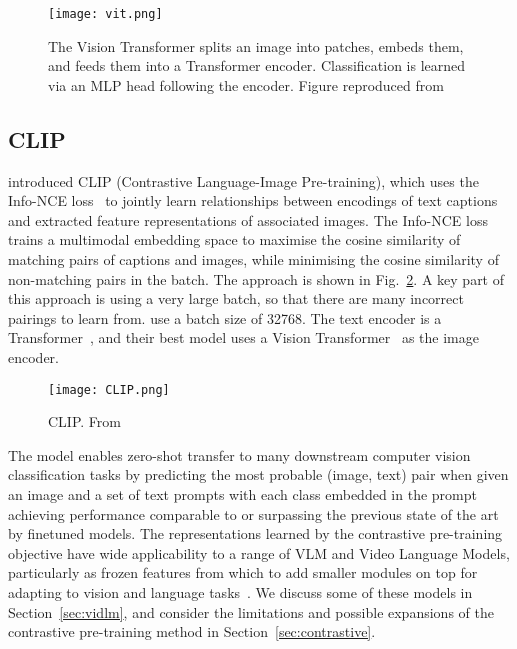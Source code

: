 \begin{figure}[htpb]
	\centering
	\texttt{[image: vit.png]}
	\caption{The Vision Transformer splits an image into patches, embeds them,
		and feeds them into a Transformer encoder. Classification is learned
		via an MLP head following the encoder. Figure reproduced
		from~\cite{dosovitskiy2021vit}}
	\label{fig:vit}
\end{figure}


\subsection{CLIP}
\label{ssec:clip}

\cite{radford2021clip} introduced CLIP (Contrastive Language-Image
Pre-training), which uses the Info-NCE loss~\citep{oord2019infonce} to jointly
learn relationships between encodings of text captions and extracted feature
representations of associated images. The Info-NCE loss trains a multimodal
embedding space to maximise the cosine similarity of matching pairs of captions
and images, while minimising the cosine similarity of non-matching pairs in the
batch. The approach is shown in Fig.~\ref{fig:clip}. A key part of this
approach is using a very large batch, so that there are many incorrect pairings
to learn from. \cite{radford2021clip} use a batch size of 32768. The text
encoder is a Transformer~\citep{vaswani2017attention}, and their best model
uses a Vision Transformer~\citep{dosovitskiy2021vit} as the image encoder.

\begin{figure}[htpb]
	\centering
	\texttt{[image: CLIP.png]}
	\caption{CLIP. From~\cite{radford2021clip}}
	\label{fig:clip}
\end{figure}

The model enables zero-shot transfer to many downstream computer vision
classification tasks by predicting the most probable (image, text) pair when
given an image and a set of text prompts with each class embedded in the prompt
achieving performance comparable to or surpassing the previous state of the art
by finetuned models. The representations learned by the contrastive
pre-training objective have wide applicability to a range of VLM and Video
Language Models, particularly as frozen features from which to add smaller
modules on top for adapting to vision and language
tasks~\citep{alayrac2022flamingo,lin2022evl,lei2021clipbert}. We discuss some
of these models in Section~\ref{sec:vidlm}, and consider the limitations and
possible expansions of the contrastive pre-training method
in Section~\ref{sec:contrastive}.


